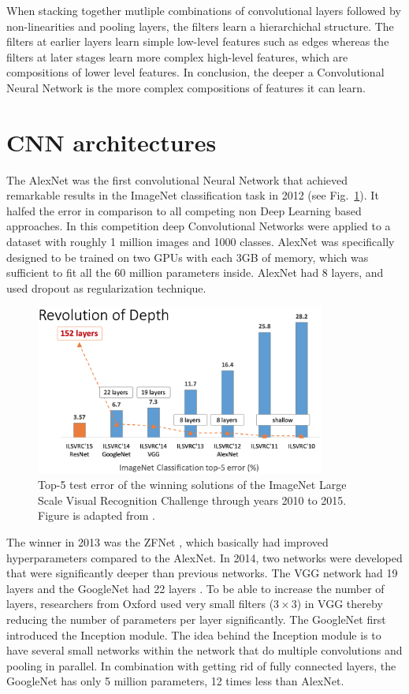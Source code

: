 When stacking together mutliple combinations of convolutional layers followed by non-linearities and pooling layers, the filters learn a hierarchichal structure. The filters at earlier layers learn simple low-level features such as edges whereas the filters at later stages learn more complex high-level features, which are compositions of lower level features. In conclusion, the deeper a Convolutional Neural Network is the more complex compositions of features it can learn.

\section{CNN architectures}\label{sec:CNNArchitectures}
The AlexNet was the first convolutional Neural Network that achieved remarkable results in the ImageNet classification task in 2012 (see Fig.~\ref{fig:imagenet}). It halfed the error in comparison to all competing non Deep Learning based approaches. In this competition deep Convolutional Networks were applied to a dataset with roughly 1 million images and 1000 classes. AlexNet was specifically designed to be trained on two GPUs with each 3GB of memory, which was sufficient to fit all the 60 million parameters inside. AlexNet had 8 layers, and used dropout as regularization technique.

\begin{figure}[h!]
	\centering
	\captionsetup{width=1\linewidth}
	\includegraphics[width=0.85\textwidth]{Figures/imagenet_evolution.png}
	\caption{Top-5 test error of the winning solutions of the ImageNet Large Scale Visual Recognition Challenge through years 2010 to 2015. Figure is adapted from \parencite{ilsvrc2015}.}
	\label{fig:imagenet}
\end{figure}

The winner in 2013 was the ZFNet \parencite{zeiler2013}, which basically had improved hyperparameters compared to the AlexNet. In 2014, two networks were developed that were significantly deeper than previous networks. The VGG network \parencite{simonyan2014} had 19 layers and the GoogleNet had 22 layers \parencite{szegedy2014}. To be able to increase the number of layers, researchers from Oxford used very small filters ($3\times3$) in VGG thereby reducing the number of parameters per layer significantly. The GoogleNet first introduced the Inception module. The idea behind the Inception module is to have several small networks within the network that do multiple convolutions and pooling in parallel. In combination with getting rid of fully connected layers, the GoogleNet has only 5 million parameters, 12 times less than AlexNet. 

